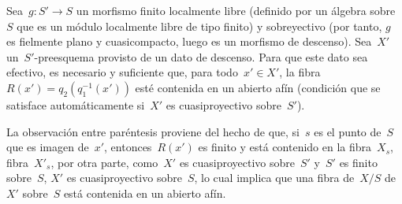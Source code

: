 \begin{corollaire}
\label{VIII.7.6}
Sea~$g\colon S'\to S$ un morfismo finito localmente libre (\ie definido por
un álgebra sobre~$S$ que es un módulo localmente libre de tipo finito) y
sobreyectivo (por tanto, $g$ es fielmente plano y cuasicompacto, luego es un
morfismo de descenso). Sea~$X'$ un~$S'$-preesquema provisto de un dato de
descenso. Para que este dato sea efectivo, es necesario y suficiente que,
para todo~$x'\in X'$, la fibra~$R(x')=q_{2}(q_{1}^{-1}(x'))$ esté contenida
en un abierto afín (condición que se satisface automáticamente si~$X'$ es
cuasiproyectivo sobre~$S'$).
\end{corollaire}

La observación entre paréntesis proviene del hecho de que, si~$s$ es el
punto de~$S$ que es imagen de~$x'$, entonces~$R(x')$ es finito y está
contenido en la
{fibra~$X_{s}$,}
{fibra~$X'_{s}$,}
por otra parte, como~$X'$ es cuasiproyectivo sobre~$S'$ y~$S'$ es finito
sobre~$S$, $X'$ es cuasiproyectivo sobre~$S$, lo cual implica que una fibra
{de~$X/S$}
{de~$X'$ sobre~$S$}
está contenida en un abierto afín.

